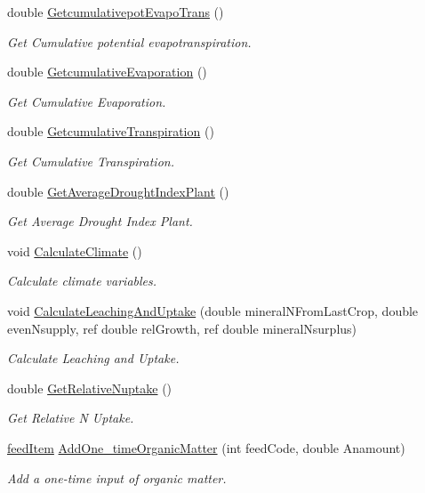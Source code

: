\begin{DoxyCompactItemize}
double \mbox{\hyperlink{class_crop_class_a949f4be661243a2809af653cead177e1}{Getcumulativepot\+Evapo\+Trans}} ()
\begin{DoxyCompactList}\small\item\em Get Cumulative potential evapotranspiration. \end{DoxyCompactList}\item 
double \mbox{\hyperlink{class_crop_class_a07f500e6b248c2c073140b44e4e4d8c7}{Getcumulative\+Evaporation}} ()
\begin{DoxyCompactList}\small\item\em Get Cumulative Evaporation. \end{DoxyCompactList}\item 
double \mbox{\hyperlink{class_crop_class_a4fc23e5a31457a2f088ab6ffcb394fa2}{Getcumulative\+Transpiration}} ()
\begin{DoxyCompactList}\small\item\em Get Cumulative Transpiration. \end{DoxyCompactList}\item 
double \mbox{\hyperlink{class_crop_class_aa859e71adecc03738e986fb81d0396ea}{Get\+Average\+Drought\+Index\+Plant}} ()
\begin{DoxyCompactList}\small\item\em Get Average Drought Index Plant. \end{DoxyCompactList}\item 
void \mbox{\hyperlink{class_crop_class_add2e8db24ef3c2fa6d1fdbe5ba617097}{Calculate\+Climate}} ()
\begin{DoxyCompactList}\small\item\em Calculate climate variables. \end{DoxyCompactList}\item 
void \mbox{\hyperlink{class_crop_class_ae0e4325ab32156542dbdc53a9ccb427b}{Calculate\+Leaching\+And\+Uptake}} (double mineral\+N\+From\+Last\+Crop, double even\+Nsupply, ref double rel\+Growth, ref double mineral\+Nsurplus)
\begin{DoxyCompactList}\small\item\em Calculate Leaching and Uptake. \end{DoxyCompactList}\item 
double \mbox{\hyperlink{class_crop_class_ad636f411f04fe154b85e96d254a60bf7}{Get\+Relative\+Nuptake}} ()
\begin{DoxyCompactList}\small\item\em Get Relative N Uptake. \end{DoxyCompactList}\item 
\mbox{\hyperlink{classfeed_item}{feed\+Item}} \mbox{\hyperlink{class_crop_class_aa0f85f842c98fcdebc9c914fde896246}{Add\+One\+\_\+time\+Organic\+Matter}} (int feed\+Code, double Anamount)
\begin{DoxyCompactList}\small\item\em Add a one-\/time input of organic matter. \end{DoxyCompactList}\end{DoxyCompactItemize}
